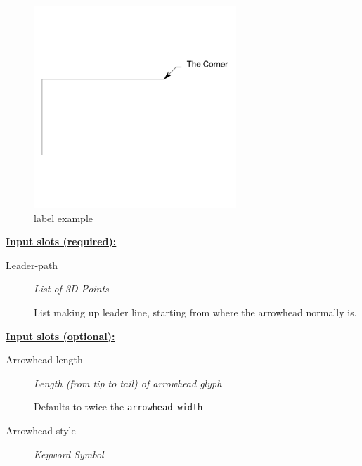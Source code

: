 \documentclass [11pt]{book}
\begin{document}
\begin{itemize}
\begin{figure}
\end{figure}

\begin{figure}
\begin{center}
\includegraphics[width=3in,height=3in]{../images/example-label.pdf}
\end{center}

\caption{label example}

\label{fig:label}

\end{figure}





\textbf{
\underline{Input slots (required):}}

\begin{description}

\item [Leader-path]
\emph{List of 3D Points}

 List making up leader line, starting from where the arrowhead normally is.




\end{description}






\textbf{
\underline{Input slots (optional):}}

\begin{description}

\item [Arrowhead-length]
\emph{Length (from tip to tail) of arrowhead glyph}

 Defaults to twice the \texttt{arrowhead-width}




\item [Arrowhead-style]
\emph{Keyword Symbol}


\end{description}
\end{itemize}
\end{document}
